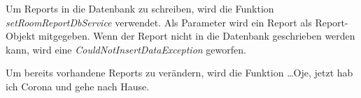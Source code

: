 

Um Reports in die Datenbank zu schreiben, wird die Funktion \emph{setRoomReportDbService} verwendet. Als Parameter wird ein Report als Report-Objekt mitgegeben. Wenn der Report nicht in die Datenbank geschrieben werden kann, wird eine \emph{CouldNotInsertDataException} geworfen.



Um bereits vorhandene Reports zu verändern, wird die Funktion \dots Oje, jetzt hab ich Corona und gehe nach Hause.